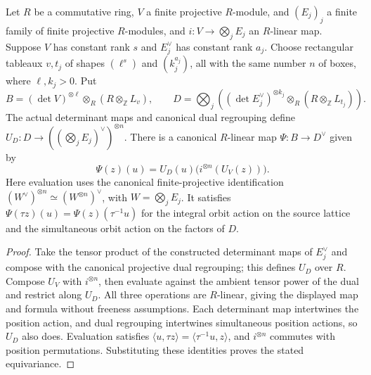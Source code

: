 \begin{lemma}
\label{lem:integral-canonical-pairing}
\leanok
Let $R$ be a commutative ring, $V$ a finite projective $R$-module,
and $(E_j)_j$ a finite family of finite projective $R$-modules, and $i:V\to\bigotimes_j E_j$ an $R$-linear map.
Suppose $V$ has constant rank $s$ and $E_j^\vee$ has constant rank
$a_j$. Choose rectangular tableaux $v,t_j$ of shapes $(\ell^s)$
and $(k_j^{a_j})$, all with the same number $n$ of boxes, where
$\ell,k_j>0$. Put
\[
 B=(\det V)^{\otimes\ell}\otimes_R(R\otimes_{\mathbb Z}L_v),\qquad
 D=\bigotimes_j\left((\det E_j^\vee)^{\otimes k_j}
       \otimes_R(R\otimes_{\mathbb Z}L_{t_j})\right).
\]
The actual determinant maps and canonical dual regrouping define
$U_D:D\to((\bigotimes_j E_j)^\vee)^{\otimes n}$. There is a
canonical $R$-linear map $\Psi:B\to D^\vee$ given by
\[
 \Psi(z)(u)=U_D(u)\bigl(i^{\otimes n}(U_V(z))\bigr).
\]
Here evaluation uses the canonical finite-projective identification
$(W^\vee)^{\otimes n}\simeq(W^{\otimes n})^\vee$, with
$W=\bigotimes_jE_j$. It satisfies $\Psi(\tau z)(u)=\Psi(z)(\tau^{-1}u)$ for the
integral orbit action on the source lattice and the simultaneous
orbit action on the factors of $D$.
\end{lemma}
\begin{proof}
Take the tensor product of the constructed determinant maps of
$E_j^\vee$ and compose with the canonical projective dual regrouping;
this defines $U_D$ over $R$. Compose $U_V$ with $i^{\otimes n}$,
then evaluate against the ambient tensor power of the dual and
restrict along $U_D$. All three operations are $R$-linear, giving
the displayed map and formula without freeness assumptions.
Each determinant map intertwines the position action, and dual
regrouping intertwines simultaneous position actions, so $U_D$
also does. Evaluation satisfies
$\langle u,\tau z\rangle=\langle\tau^{-1}u,z\rangle$,
and $i^{\otimes n}$ commutes with position permutations.
Substituting these identities proves the stated equivariance.
\end{proof}

